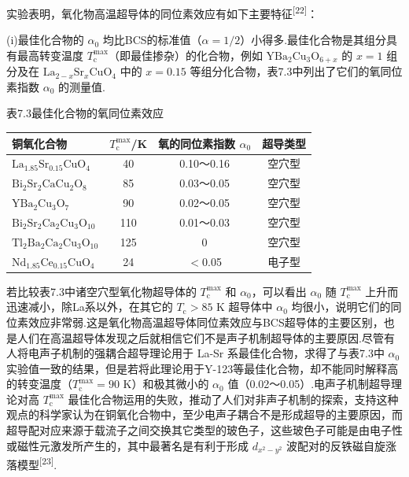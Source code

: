 实验表明，氧化物高温超导体的同位素效应有如下主要特征\textsuperscript{[22]}：

(i)最佳化合物的 $\alpha_{0}$ 均比BCS的标准值（$\alpha=1/2$）小得多.最佳化合物是其组分具有最高转变温度 $T_{\mathrm{c}}^{\mathrm{max}}$（即最佳掺杂）的化合物，例如 $\mathrm{YBa}_{2}\mathrm{Cu}_{3}\mathrm{O}_{6+x}$ 的 $x=1$ 组分及在 $\mathrm{La}_{2-x}\mathrm{Sr}_{x}\mathrm{CuO}_{4}$ 中的 $x=0.15$ 等组分化合物，表7.3中列出了它们的氧同位素指数 $\alpha_{0}$ 的测量值.

表7.3\quad 最佳化合物的氧同位素效应

\begin{center}\small
\begin{tabular}{lccc}
\hline
铜氧化合物 & $T_{\mathrm{c}}^{\mathrm{max}}$/K & 氧的同位素指数 $\alpha_{0}$ & 超导类型\\
\hline
$\mathrm{La}_{1.85}\mathrm{Sr}_{0.15}\mathrm{CuO}_{4}$ & 40 & 0.10～0.16 & 空穴型\\
$\mathrm{Bi}_{2}\mathrm{Sr}_{2}\mathrm{CaCu}_{2}\mathrm{O}_{8}$ & 85 & 0.03～0.05 & 空穴型\\
$\mathrm{YBa}_{2}\mathrm{Cu}_{3}\mathrm{O}_{7}$ & 90 & 0.02～0.05 & 空穴型\\
$\mathrm{Bi}_{2}\mathrm{Sr}_{2}\mathrm{Ca}_{2}\mathrm{Cu}_{3}\mathrm{O}_{10}$ & 110 & 0.01～0.03 & 空穴型\\
$\mathrm{Tl}_{2}\mathrm{Ba}_{2}\mathrm{Ca}_{2}\mathrm{Cu}_{3}\mathrm{O}_{10}$ & 125 & 0 & 空穴型\\
$\mathrm{Nd}_{1.85}\mathrm{Ce}_{0.15}\mathrm{CuO}_{4}$ & 24 & $<$0.05 & 电子型\\
\hline
\end{tabular}
\end{center}

若比较表7.3中诸空穴型氧化物超导体的 $T_{\mathrm{c}}^{\mathrm{max}}$ 和 $\alpha_{0}$，可以看出 $\alpha_{0}$ 随 $T_{\mathrm{c}}^{\mathrm{max}}$ 上升而迅速减小，除La系以外，在其它的 $T_{\mathrm{c}}>85$ K 超导体中 $\alpha_{0}$ 均很小，说明它们的同位素效应非常弱.这是氧化物高温超导体同位素效应与BCS超导体的主要区别，也是人们在高温超导体发现之后就相信它们不是声子机制超导体的主要原因.尽管有人将电声子机制的强耦合超导理论用于 La-Sr 系最佳化合物，求得了与表7.3中 $\alpha_{0}$ 实验值一致的结果，但是若将此理论用于Y-123等最佳化合物，却不能同时解释高的转变温度（$T_{\mathrm{c}}^{\mathrm{max}}=90$ K）和极其微小的 $\alpha_{0}$ 值（0.02～0.05）.电声子机制超导理论对高 $T_{\mathrm{c}}^{\mathrm{max}}$ 最佳化合物运用的失败，推动了人们对非声子机制的探索，支持这种观点的科学家认为在铜氧化合物中，至少电声子耦合不是形成超导的主要原因，而超导配对应来源于载流子之间交换其它类型的玻色子，这些玻色子可能是由电子性或磁性元激发所产生的，其中最著名是有利于形成 $d_{x^{2}-y^{2}}$ 波配对的反铁磁自旋涨落模型\textsuperscript{[23]}.


